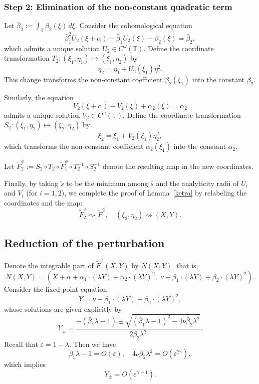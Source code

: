 \documentclass{amsart}
\theoremstyle{definition}
\begin{document}
\subsubsection{Step 2: Elimination of the non-constant quadratic term}

Let $\bar{\beta}_2 := \int_\mathbb{T} \beta_2(\xi)\, d\xi$. Consider the cohomological equation
\[
\bar{\beta}_1^2 U_2(\xi + \alpha) - \bar{\beta}_1 U_2(\xi) + \beta_2(\xi) = \bar{\beta}_2,
\]
which admits a unique solution $U_2 \in C^\omega(\mathbb{T})$. Define the coordinate transformation $T_2: (\xi_1, \eta_1) \mapsto (\xi_1, \eta_2)$ by
\[
\eta_2 = \eta_1 + U_2(\xi_1) \eta_1^2.
\]
This change transforms the non-constant coefficient $\beta_2(\xi_1)$ into the constant $\bar{\beta}_2$.

Similarly, the equation
\[
V_2(\xi + \alpha) - V_2(\xi) + \alpha_2(\xi) = \bar{\alpha}_2
\]
admits a unique solution $V_2 \in C^\omega(\mathbb{T})$. Define the coordinate transformation $S_2: (\xi_1, \eta_2) \mapsto (\xi_2, \eta_2)$ by
\[
\xi_2 = \xi_1 + V_2(\xi_1) \eta_2^2,
\]
which transforms the non-constant coefficient $\alpha_2(\xi_1)$ into the constant $\bar{\alpha}_2$.

Let $\tilde{F}_2^\phi := S_2 \circ T_2 \circ \tilde{F}_1^\phi \circ T_2^{-1} \circ S_2^{-1}$ denote the resulting map in the new coordinates.

Finally, by taking $\tilde{s}$ to be the minimum among $\bar{s}$ and the analyticity radii of $U_i$ and $V_i$ (for $i = 1, 2$), we complete the proof of Lemma~\ref{ketra} by relabeling the coordinates and the map:
\[
\tilde{F}_2^\phi \rightsquigarrow \tilde{F}^\phi, \quad (\xi_2, \eta_2) \rightsquigarrow (X, Y).
\]


 \subsection{Reduction of the perturbation}



Denote the integrable part of $\tilde{F}^\phi(X,Y)$ by $N(X,Y)$, that is,
\[
N(X,Y) = \left(X + \alpha + \bar{\alpha}_1 \cdot (\lambda Y) + \bar{\alpha}_2 \cdot (\lambda Y)^2,\; \nu + \bar{\beta}_1 \cdot (\lambda Y) + \bar{\beta}_2 \cdot (\lambda Y)^2\right).
\]
Consider the fixed point equation
\[
Y = \nu + \bar{\beta}_1 \cdot (\lambda Y) + \bar{\beta}_2 \cdot (\lambda Y)^2,
\]
whose solutions are given explicitly by
\[
Y_{\pm} = \frac{-(\bar{\beta}_1 \lambda - 1) \pm \sqrt{(\bar{\beta}_1 \lambda - 1)^2 - 4\nu \bar{\beta}_2 \lambda^2}}{2 \bar{\beta}_2 \lambda^2}.
\]
Recall that $\varepsilon = 1 - \lambda$. Then we have
\[
\bar{\beta}_1 \lambda - 1 = O(\varepsilon), \quad 4\nu \bar{\beta}_2 \lambda^2 = O(\varepsilon^{2\gamma}),
\]
which implies
\[
Y_{\pm} = O(\varepsilon^{\gamma - 1}).
\]
\end{document}
